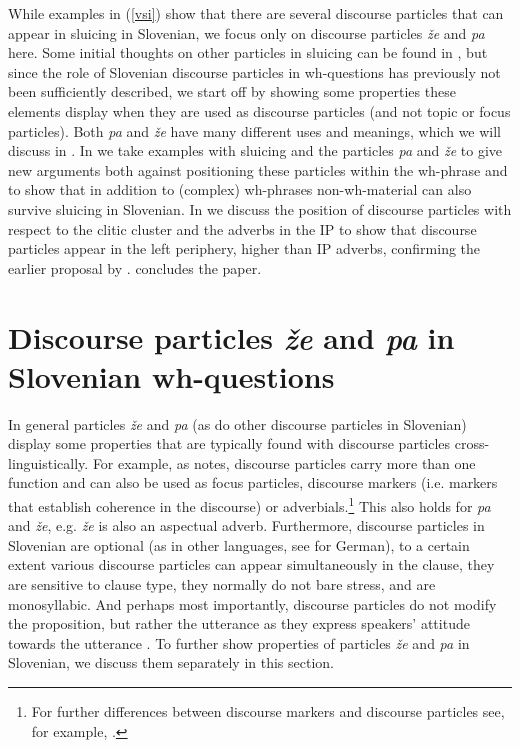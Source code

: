 \documentclass[output=paper,
modfonts,
newtxmath,
hidelinks
]{langscibook}
\begin{document}
\noindent While examples in (\ref{vsi}) show that there are several discourse particles that can appear in sluicing in Slovenian, we focus only on discourse particles \textit{že} and \textit{pa} here. Some initial thoughts on other particles in sluicing can be found in \cite{marusicetal2015}, but since the role of Slovenian discourse particles in wh-questions has previously not been sufficiently described, we start off by showing some properties these elements display when they are used as discourse particles (and not topic or focus particles). Both \textit{pa} and \textit{že} have many different uses and meanings, which we will discuss in . In  we take examples with sluicing and the particles \textit{pa} and \textit{že} to give new arguments both against positioning these particles within the wh-phrase and to show that in addition to (complex) wh-phrases non-wh-material can also survive sluicing in Slovenian. In  we discuss the position of discourse particles with respect to the  clitic cluster and the adverbs in the IP to show that discourse particles appear in the left periphery, higher than IP adverbs, confirming the earlier proposal by \cite{marusicetal2015}.  concludes the paper.


\section{Discourse particles \textit{že} and \textit{pa} in Slovenian wh-questions}\label{s2}

In general particles \textit{že} and \textit{pa} (as do other discourse particles in Slovenian) display some properties that are typically found with discourse particles cross-lingui\-sti\-cal\-ly. For example, as \cite{zimmermann2011} notes, discourse particles carry more than one function and can also be used as focus particles, discourse markers (i.e. markers that establish coherence in the discourse) or adverbials.\footnote{For further differences between discourse markers and discourse particles see, for example, \cite{zimmermann2011}.} This also holds for \textit{pa} and \textit{že}, e.g. \textit{že} is also an aspectual adverb. Furthermore, discourse particles in Slovenian are optional (as in other languages, see \citealt{bayerobenauer2011} for German), to a certain extent various discourse particles can appear simultaneously in the clause, they are sensitive to clause type, they normally do not bare stress, and are monosyllabic. And perhaps most importantly, discourse particles do not modify the proposition, but rather the utterance \citep{bayerobenauer2011} as they express speakers' attitude towards the utterance \citep{zimmermann2011}. To further show properties of particles \textit{že} and \textit{pa} in Slovenian, we discuss them separately in this section. 
\end{document}
